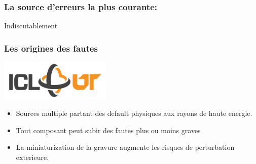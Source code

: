 \documentclass{beamer}
\begin{document}
\begin{frame} 
  \frametitle{La source d'erreurs la plus courante:}
  Indiscutablement

\end{frame}

\begin{frame}
  \frametitle{Les origines des fautes}
  \includegraphics[width=0.4\textwidth]{ICL-slide-logo}
  \begin{itemize}
  \item Sources multiple partant des default physiques aux rayons de haute
    energie.
  \item Tout composant peut subir des fautes plus ou moins graves
  \item La miniaturization de la gravure augmente les risques de perturbation
    exterieure.
  \end{itemize}
\end{frame}

\end{document}
